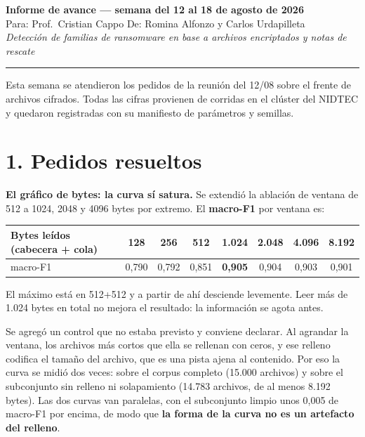 \documentclass[11pt,a4paper]{article}
\begin{document}
\begin{center}
{\large\bfseries Informe de avance --- semana del 12 al 18 de agosto de 2026}\\[6pt]
{\small Para: Prof.\ Cristian Cappo \quad\textbullet\quad
De: Romina Alfonzo y Carlos Urdapilleta}\\[4pt]
{\footnotesize\itshape Detección de familias de ransomware en base a archivos encriptados
y notas de rescate}
\end{center}

\vspace{0.3em}
\hrule
\vspace{0.9em}

Esta semana se atendieron los pedidos de la reunión del 12/08 sobre el frente de archivos
cifrados. Todas las cifras provienen de corridas en el clúster del NIDTEC y quedaron
registradas con su manifiesto de parámetros y semillas.

\section*{1. Pedidos resueltos}

\textbf{El gráfico de bytes: la curva sí satura.} Se extendió la ablación de ventana de 512 a
1024, 2048 y 4096 bytes por extremo. El \textbf{macro-F1} por ventana es:

\begin{center}
\small
\begin{tabular}{lccccccc}
\toprule
Bytes leídos (cabecera + cola) & 128 & 256 & 512 & \textbf{1.024} & 2.048 & 4.096 & 8.192 \\
\midrule
macro-F1 & 0,790 & 0,792 & 0,851 & \textbf{0,905} & 0,904 & 0,903 & 0,901 \\
\bottomrule
\end{tabular}
\end{center}

El máximo está en 512+512 y a partir de ahí desciende levemente. Leer más de 1.024 bytes en
total no mejora el resultado: la información se agota antes.

Se agregó un control que no estaba previsto y conviene declarar. Al agrandar la ventana, los
archivos más cortos que ella se rellenan con ceros, y ese relleno codifica el tamaño del
archivo, que es una pista ajena al contenido. Por eso la curva se midió dos veces: sobre el
corpus completo (15.000 archivos) y sobre el subconjunto sin relleno ni solapamiento
(14.783 archivos, de al menos 8.192 bytes). Las dos curvas van paralelas, con el subconjunto
limpio unos 0,005 de macro-F1 por encima, de modo que \textbf{la forma de la curva no es un
artefacto del relleno}.
\end{document}
